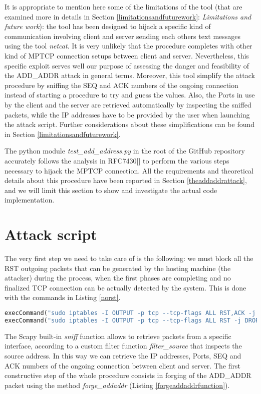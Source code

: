 It is appropriate to mention here some of the limitations of the tool (that are examined more in details in Section \ref{limitationsandfuturework}: \textit{Limitations and future work}): the tool has been designed to hijack a specific kind of communication involving client and server sending each others text messages using the tool \textit{netcat}. It is very unlikely that the procedure completes with other kind of MPTCP connection setups between client and server. Nevertheless, this specific exploit serves well our purpose of assessing the danger and feasibility of the ADD\_ADDR attack in general terms.
Moreover, this tool simplify the attack procedure by sniffing the SEQ and ACK numbers of the ongoing connection instead of starting a procedure to try and guess the values. Also, the Ports in use by the client and the server are retrieved automatically by inspecting the sniffed packets, while the IP addresses have to be provided by the user when launching the attack script. Further considerations about these simplifications can be found in Section \ref{limitationsandfuturework}.

The python module \textit{test\_add\_address.py} in the root of the GitHub repository accurately follows the analysis in RFC7430[] to perform the various steps necessary to hijack the MPTCP connection. All the requirements and theoretical details about this procedure have been reported in Section \ref{theaddaddrattack}, and we will limit this section to show and investigate the actual code implementation.

\section{Attack script}
The very first step we need to take care of is the following: we must block all the RST outgoing packets that can be generated by the hosting machine (the attacker) during the process, when the first phases are completing and no finalized TCP connection can be actually detected by the system. This is done with the commands in Listing \ref{norst}.


\begin{lstlisting}[language=python, caption=\textit{Disable RST outgoing packets}, label=norst]
execCommand("sudo iptables -I OUTPUT -p tcp --tcp-flags ALL RST,ACK -j DROP", shell = True)
execCommand("sudo iptables -I OUTPUT -p tcp --tcp-flags ALL RST -j DROP", shell = True)
\end{lstlisting}

The Scapy built-in \textit{sniff} function allows to retrieve packets from a specific interface, according to a custom filter function \textit{filter\_source} that inspects the source address. In this way we can retrieve the IP addresses, Ports, SEQ and ACK numbers of the ongoing connection between client and server.
The first constructive step of the whole procedure consists in forging of the ADD\_ADDR packet using the method \textit{forge\_addaddr} (Listing \ref{forgeaddaddrfunction}).

